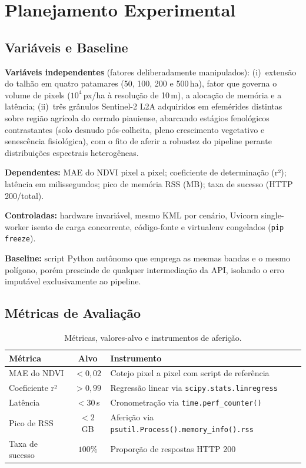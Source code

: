 \documentclass[10pt, a4paper]{article}
\begin{document}
\section{Planejamento Experimental}

\subsection{Variáveis e Baseline}

\textbf{Variáveis independentes} (fatores deliberadamente manipulados): (i)~extensão do talhão em quatro patamares (50, 100, 200 e 500\,ha), fator que governa o volume de pixels ($10^4$\,px/ha à resolução de 10\,m), a alocação de memória e a latência; (ii)~três grânulos Sentinel-2 L2A adquiridos em efemérides distintas sobre região agrícola do cerrado piauiense, abarcando estágios fenológicos contrastantes (solo desnudo pós-colheita, pleno crescimento vegetativo e senescência fisiológica), com o fito de aferir a robustez do pipeline perante distribuições espectrais heterogêneas.

\textbf{Dependentes:} MAE do NDVI pixel a pixel; coeficiente de determinação (r²); latência em milissegundos; pico de memória RSS (MB); taxa de sucesso (HTTP 200/total).

\textbf{Controladas:} hardware invariável, mesmo KML por cenário, Uvicorn single-worker isento de carga concorrente, código-fonte e virtualenv congelados (\texttt{pip freeze}).

\textbf{Baseline:} script Python autônomo que emprega as mesmas bandas e o mesmo polígono, porém prescinde de qualquer intermediação da API, isolando o erro imputável exclusivamente ao pipeline.

\subsection{Métricas de Avaliação}

\begin{table}[H]
\centering\small
\caption{Métricas, valores-alvo e instrumentos de aferição.}
\label{tab:metricas}
\begin{tabularx}{\textwidth}{p{2.8cm}cX}
\toprule
\textbf{Métrica} & \textbf{Alvo} & \textbf{Instrumento} \\
\midrule
MAE do NDVI & $<0{,}02$ & Cotejo pixel a pixel com script de referência \\
Coeficiente r² & $>0{,}99$ & Regressão linear via \texttt{scipy.stats.linregress} \\
Latência & $<30$\,s & Cronometração via \texttt{time.perf\_counter()} \\
Pico de RSS & $<2$\,GB & Aferição via \texttt{psutil.Process().memory\_info().rss} \\
Taxa de sucesso & $100\%$ & Proporção de respostas HTTP 200 \\
\bottomrule
\end{tabularx}
\end{table}
\end{document}

